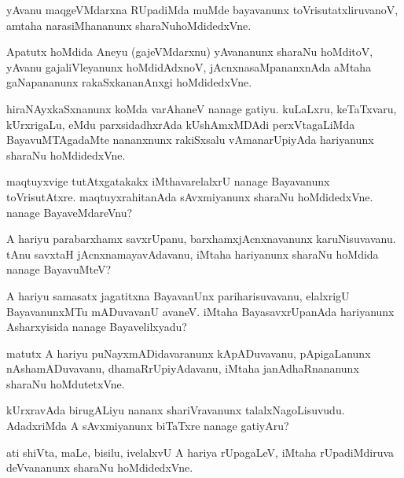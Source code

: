 \documentclass{article}
\begin{document}
\begin{mn}
yAvanu maqgeVMdarxna RUpadiMda muMde bayavanunx toVrisutatxliruvanoV,  
amtaha narasiMhananunx sharaNuhoMdidedxVne.
\end{mn}

\begin{mn}
Apatutx hoMdida Aneyu (gajeVMdarxnu) yAvananunx sharaNu hoMditoV, yAvanu 
gajaliVleyanunx hoMdidAdxnoV,  jAcnxnasaMpananxnAda aMtaha gaNapananunx 
rakaSxkananAnxgi hoMdidedxVne.
\end{mn}

\begin{mn}
hiraNAyxkaSxnanunx koMda varAhaneV nanage gatiyu. kuLaLxru, keTaTxvaru, 
kUrxrigaLu, eMdu parxsidadhxrAda kUshAmxMDAdi perxVtagaLiMda BayavuMTAgadaMte 
nananxnunx rakiSxsalu vAmanarUpiyAda hariyanunx sharaNu hoMdidedxVne.
\end{mn}

\begin{mn}
maqtuyxvige tutAtxgatakakx iMthavarelalxrU nanage Bayavanunx toVrisutAtxre.  
maqtuyxrahitanAda sAvxmiyanunx sharaNu hoMdidedxVne.  nanage BayaveMdareVnu?
\end{mn}

\begin{mn}
A hariyu parabarxhamx savxrUpanu,  barxhamxjAcnxnavanunx  karuNisuvavanu.  
tAnu savxtaH jAcnxnamayavAdavanu,  iMtaha  hariyanunx sharaNu hoMdida nanage BayavuMteV?
\end{mn}

\begin{mn}
A hariyu samasatx jagatitxna BayavanUnx pariharisuvavanu, elalxrigU BayavanunxMTu 
mADuvavanU  avaneV. iMtaha BayasavxrUpanAda hariyanunx Asharxyisida nanage Bayavelilxyadu?
\end{mn}

\begin{mn}
matutx A hariyu puNayxmADidavaranunx kApADuvavanu, pApigaLanunx nAshamADuvavanu, 
dhamaRrUpiyAdavanu, iMtaha  janAdhaRnananunx sharaNu hoMdutetxVne.
\end{mn}

\begin{mn}
kUrxravAda birugALiyu nananx shariVravanunx  talalxNagoLisuvudu. AdadxriMda 
A sAvxmiyanunx biTaTxre  nanage gatiyAru?
\end{mn}

\begin{mn}
ati shiVta, maLe, bisilu, ivelalxvU A hariya rUpagaLeV, iMtaha rUpadiMdiruva 
deVvananunx  sharaNu hoMdidedxVne.
\end{mn}
\end{document}
